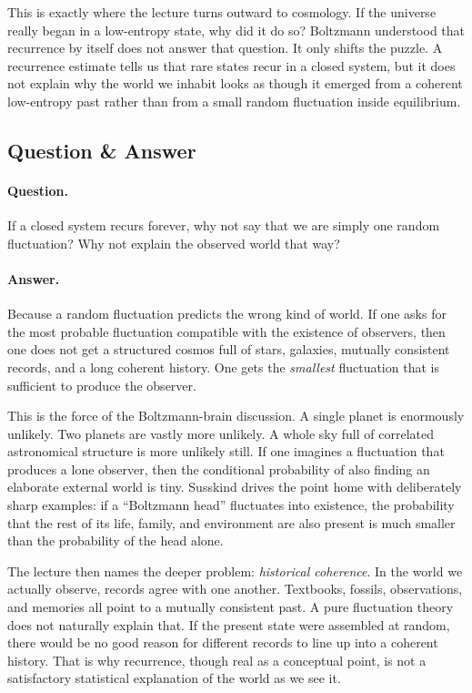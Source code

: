 This is exactly where the lecture turns outward to cosmology. If the universe really began in a low-entropy state, why did it do so? Boltzmann understood that recurrence by itself does not answer that question. It only shifts the puzzle. A recurrence estimate tells us that rare states recur in a closed system, but it does not explain why the world we inhabit looks as though it emerged from a coherent low-entropy past rather than from a small random fluctuation inside equilibrium.

\subsection{Question \& Answer}

\paragraph{Question.} If a closed system recurs forever, why not say that we are simply one random fluctuation? Why not explain the observed world that way?

\paragraph{Answer.} Because a random fluctuation predicts the wrong kind of world. If one asks for the most probable fluctuation compatible with the existence of observers, then one does not get a structured cosmos full of stars, galaxies, mutually consistent records, and a long coherent history. One gets the \emph{smallest} fluctuation that is sufficient to produce the observer.

This is the force of the Boltzmann-brain discussion. A single planet is enormously unlikely. Two planets are vastly more unlikely. A whole sky full of correlated astronomical structure is more unlikely still. If one imagines a fluctuation that produces a lone observer, then the conditional probability of also finding an elaborate external world is tiny. Susskind drives the point home with deliberately sharp examples: if a ``Boltzmann head'' fluctuates into existence, the probability that the rest of its life, family, and environment are also present is much smaller than the probability of the head alone.

The lecture then names the deeper problem: \emph{historical coherence}. In the world we actually observe, records agree with one another. Textbooks, fossils, observations, and memories all point to a mutually consistent past. A pure fluctuation theory does not naturally explain that. If the present state were assembled at random, there would be no good reason for different records to line up into a coherent history. That is why recurrence, though real as a conceptual point, is not a satisfactory statistical explanation of the world as we see it.

